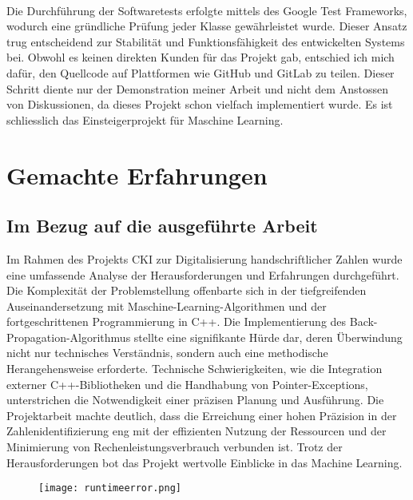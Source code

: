\\
Die Durchführung der Softwaretests erfolgte mittels des Google Test Frameworks, wodurch eine gründliche Prüfung jeder Klasse gewährleistet wurde. Dieser Ansatz trug entscheidend zur Stabilität und Funktionsfähigkeit des entwickelten Systems bei. Obwohl es keinen direkten Kunden für das Projekt gab, entschied ich mich dafür, den Quellcode auf Plattformen wie GitHub und GitLab zu teilen. Dieser Schritt diente nur der Demonstration meiner Arbeit und nicht dem Anstossen von Diskussionen, da dieses Projekt schon vielfach implementiert wurde. Es ist schliesslich das Einsteigerprojekt für Maschine Learning.

\section{Gemachte Erfahrungen}
\subsection{Im Bezug auf die ausgeführte Arbeit}
Im Rahmen des Projekts CKI zur Digitalisierung handschriftlicher Zahlen wurde eine umfassende Analyse der Herausforderungen und Erfahrungen durchgeführt. Die Komplexität der Problemstellung offenbarte sich in der tiefgreifenden Auseinandersetzung mit Maschine-Learning-Algorithmen und der fortgeschrittenen Programmierung in C++. Die Implementierung des Back-Propagation-Algorithmus stellte eine signifikante Hürde dar, deren Überwindung nicht nur technisches Verständnis, sondern auch eine methodische Herangehensweise erforderte. Technische Schwierigkeiten, wie die Integration externer C++-Bibliotheken und die Handhabung von Pointer-Exceptions, unterstrichen die Notwendigkeit einer präzisen Planung und Ausführung. Die Projektarbeit machte deutlich, dass die Erreichung einer hohen Präzision in der Zahlenidentifizierung eng mit der effizienten Nutzung der Ressourcen und der Minimierung von Rechenleistungsverbrauch verbunden ist. Trotz der Herausforderungen bot das Projekt wertvolle Einblicke in das Machine Learning.
\begin{figure}[htbp]
	\centering
		\texttt{[image: runtimeerror.png]}
	\label{fig:runtimeerror}
\end{figure}

